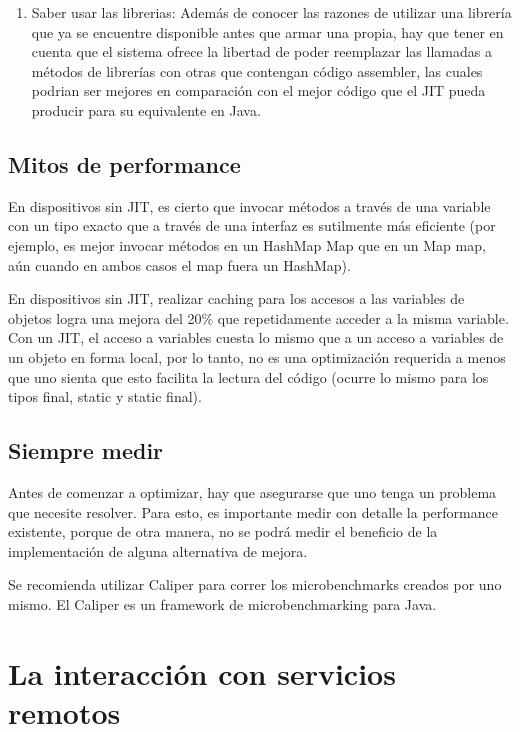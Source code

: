 \begin{enumerate}
\item Saber usar las librerias: Adem\'as de conocer las razones de utilizar una librer\'ia que ya se encuentre disponible antes que armar una propia, hay que tener en cuenta que el sistema ofrece la libertad de poder reemplazar las llamadas a m\'etodos de librer\'ias con otras que contengan c\'odigo assembler, las cuales podrian ser mejores en comparaci\'on con el mejor c\'odigo que el \ac{JIT} pueda producir para su equivalente en Java.

\end{enumerate}

\subsection{Mitos de performance}
\label{subsec:dev.perf.myths}

En dispositivos sin \ac{JIT}, es cierto que invocar m\'etodos a trav\'es de una variable con un tipo exacto que a trav\'es de una interfaz es sutilmente m\'as eficiente (por ejemplo, es mejor invocar m\'etodos en un HashMap Map que en un Map map, a\'un cuando en ambos casos el map fuera un HashMap). 

En dispositivos sin \ac{JIT}, realizar caching para los accesos a las variables de objetos logra una mejora del 20\% que repetidamente acceder a la misma variable. Con un \ac{JIT}, el acceso a variables cuesta lo mismo que a un acceso a variables de un objeto en forma local, por lo tanto, no es una optimizaci\'on requerida a menos que uno sienta que esto facilita la lectura del c\'odigo (ocurre lo mismo para los tipos final, static y static final).

\subsection{Siempre medir}
\label{subsec:dev.perf.measure.always}

Antes de comenzar a optimizar, hay que asegurarse que uno tenga un problema que necesite resolver. Para esto, es importante medir con detalle la performance existente, porque de otra manera, no se podr\'a medir el beneficio de la implementaci\'on de alguna alternativa de mejora.

Se recomienda utilizar Caliper para correr los microbenchmarks creados por uno mismo. El Caliper es un framework de microbenchmarking para Java.

\section{La interacción con servicios remotos}
\label{sec:remote.services}

